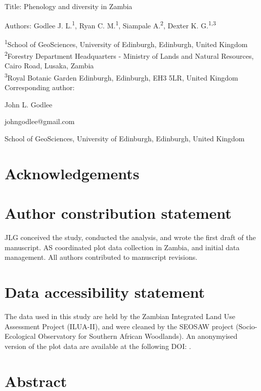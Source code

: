 \documentclass[11pt,a4paper]{article}
\begin{document}
{\Large{Title: Phenology and diversity in Zambia}}

Authors: Godlee J. L.\textsuperscript{1}, Ryan C. M.\textsuperscript{1}, Siampale A.\textsuperscript{2}, Dexter K. G.\textsuperscript{1,3}

\textsuperscript{1}School of GeoSciences, University of Edinburgh, Edinburgh, United Kingdom \\
\textsuperscript{2}Forestry Department Headquarters - Ministry of Lands and Natural Resources, Cairo Road, Lusaka, Zambia \\
\textsuperscript{3}Royal Botanic Garden Edinburgh, Edinburgh, EH3 5LR, United Kingdom \\

\vspace{1em}
Corresponding author:

John L. Godlee

johngodlee@gmail.com

School of GeoSciences, University of Edinburgh, Edinburgh, United Kingdom

\section*{Acknowledgements}

\section*{Author constribution statement}

JLG conceived the study, conducted the analysis, and wrote the first draft of the manuscript. AS coordinated plot data collection in Zambia, and initial data management. All authors contributed to manuscript revisions. 

\section*{Data accessibility statement}

The data used in this study are held by the Zambian Integrated Land Use Assessment Project (ILUA-II), and were cleaned by the SEOSAW project (Socio-Ecological Observatory for Southern African Woodlands). An anonymyised version of the plot data are available at the following DOI: .

\newpage{}
\linenumbers

\section*{Abstract}
\end{document}

